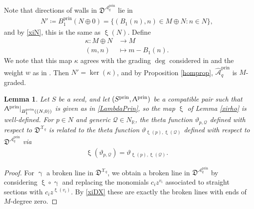 \documentclass{amsart}
\DeclareMathOperator{\prin}{prin}
\let\bb=\mathbb
\let\f=\mathfrak
\let\s=\mathcal
\let\wh=\widehat
\newcommand {\sQ} {\mathcal{Q}}
\renewcommand{\gamma}{\upgamma}
\renewcommand{\xi}{\upxi}
\renewcommand{\Lambda}{\Uplambda}
\theoremstyle{plain}%
\newtheorem{lem}[thm]{Lemma}
\theoremstyle{definition}
\theoremstyle{remark}
\begin{document}
Note that directions of walls in $\f{D}^{\s{A}^{\prin}_q}$ lie in \begin{align}\label{Nprime}
    N'\coloneqq B_1^{\prin}(N\oplus 0) = \{(B_1(n),n)\in M\oplus N\colon n\in N\},
\end{align} 
and by \eqref{xiN}, this is the same as $\xi(N)$.  Define 
\begin{align}
\label{Mprime}
    \kappa\colon M\oplus N&\rightarrow M\\
    (m, n) &\mapsto m-B_1(n).\nonumber
\end{align}
We note that this map $\kappa$ agrees with the grading $\deg$ considered in \cite{ManCox} and the weight $w$ as in \cite[(B.3)]{GHKK}.  Then $N'=\ker(\kappa)$, and by Proposition \ref{homprop}, $\wh{\s{A}}^{\prin}_q$ is $M$-graded. 

\begin{lem}\label{prin2X}
Let $S$ be a seed, and let $(S^{\prin},\Lambda^{\prin})$ be a compatible pair such that $\Lambda^{\prin}|_{B^{\prin}_{1}((N,0))}$ is given as in \eqref{LambdaPrin}, so the map $\xi$ of Lemma \ref{xirho} is well-defined.  For $p\in N$ and generic $\sQ\in N_{\bb{R}}$, the theta function $\vartheta_{p,\sQ}$ defined with respect to $\f{D}^{\s{X}_q}$ is related to the theta function $\vartheta_{\xi(p),\xi(\sQ)}$ defined with respect to $\f{D}^{\s{A}_q^{\prin}}$ via
\begin{align*}
    \xi(\vartheta_{p,\sQ})=\vartheta_{\xi(p),\xi(\sQ)}.
\end{align*}
\end{lem}
\begin{proof}
For $\gamma$ a broken line in $\f{D}^{\s{X}_q}$, we obtain a broken line in $\f{D}^{\s{A}^{\prin}_q}$ by considering $\xi\circ \gamma$ and replacing the monomials $c_iz^{v_i}$ associated to straight sections with $c_iz^{\xi(v_i)}$.  By \eqref{xiDX} these are exactly the broken lines with ends of $M$-degree zero.
\end{proof}
\end{document}
